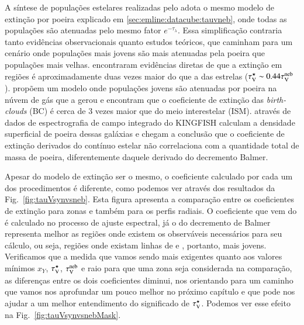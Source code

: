 A síntese de populações estelares realizadas pelo \starlight adota o mesmo modelo de extinção por
poeira explicado em \ref{sec:emline:datacube:tauvneb}, onde todas as populações são atenuadas pelo
mesmo fator $e^{-\tau_\lambda}$. Essa simplificação contraria tanto evidências observacionais quanto
estudos teóricos, que caminham para um cenário onde populações mais jovens são mais atenuadas pela
poeira que populações mais velhas. \citet{Calzetti.etal.1994a} encontraram evidências diretas de que
a extinção em regiões \Hii é aproximadamente duas vezes maior do que a das estrelas ($\tau_{\mathrm{V}}^\star \sim
0.44 \tau_{\mathrm{V}}^{\mathrm{neb}}$). \citet{Charlot.Fall.2000a} propõem um modelo onde populações jovens são atenuadas por
poeira na núvem de gás que a gerou e encontram que o coeficiente de extinção das {\em birth-clouds}
(BC) é cerca de 3 vezes maior que  do meio interestelar (ISM). \citet{Kreckel.etal.2013a} através de
dados de espectrografia de campo integrado do KINGFISH \citep{Kennicutt.etal.2011a} calculam a
densidade superficial de poeira dessas galáxias e chegam a conclusão que o coeficiente de extinção
derivados do contínuo estelar não correlaciona com a quantidade total de massa de poeira,
diferentemente daquele derivado do decremento Balmer.

Apesar do modelo de extinção ser o mesmo, o coeficiente calculado por cada um dos procedimentos é
diferente, como podemos ver através dos resultados da Fig.\ \ref{fig:tauVsynvsneb}. Esta figura
apresenta a comparação entre os coeficientes de extinção para zonas e também para os perfis radiais.
O coeficiente que vem do \starlight é calculado no processo de ajuste espectral, já o do decremento
de Balmer representa melhor as regiões onde existem os observáveis necessários para seu cálculo, ou
seja, regiões onde existam linhas de \Halpha e \Hbeta, portanto, mais jovens. Verificamos que a
medida que vamos sendo mais exigentes quanto aos valores mínimos $x_Y$, $\tau_{\mathrm{V}}^\star$, $\tau_{\mathrm{V}}^{\mathrm{neb}}$ e raio
para que uma zona seja considerada na comparação, as diferenças entre os dois coeficientes diminui,
nos orientando para um caminho que vamos nos aprofundar um pouco melhor no próximo capítulo e que pode
nos ajudar a um melhor entendimento do significado de $\tau_{\mathrm{V}}^\star$. Podemos ver esse efeito na Fig.\
\ref{fig:tauVsynvsnebMask}.

